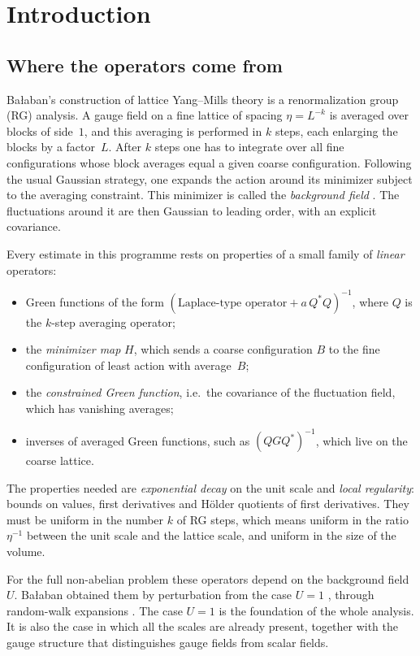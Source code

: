 \section{Introduction}\label{sec:intro}

\subsection{Where the operators come from}

Ba\l aban's construction of lattice Yang--Mills theory \cite{BalPropI,BalPropII,BalAvg,BalReg,BalBackground,BalVar,BalUV3} is a renormalization group (RG) analysis. A gauge field on a fine lattice of spacing $\eta=L^{-k}$ is averaged over blocks of side~$1$, and this averaging is performed in $k$ steps, each enlarging the blocks by a factor~$L$. After $k$ steps one has to integrate over all fine configurations whose block averages equal a given coarse configuration. Following the usual Gaussian strategy, one expands the action around its minimizer subject to the averaging constraint. This minimizer is called the \emph{background field} \cite{BalVar}. The fluctuations around it are then Gaussian to leading order, with an explicit covariance.

Every estimate in this programme rests on properties of a small family of \emph{linear} operators:
\begin{itemize}
\item Green functions of the form $(\text{Laplace-type operator}+a\,Q^*Q)^{-1}$, where $Q$ is the $k$-step averaging operator;
\item the \emph{minimizer map} $H$, which sends a coarse configuration $B$ to the fine configuration of least action with average~$B$;
\item the \emph{constrained Green function}, i.e.\ the covariance of the fluctuation field, which has vanishing averages;
\item inverses of averaged Green functions, such as $(QGQ^*)^{-1}$, which live on the coarse lattice.
\end{itemize}
The properties needed are \emph{exponential decay} on the unit scale and \emph{local regularity}: bounds on values, first derivatives and H\"older quotients of first derivatives. They must be uniform in the number $k$ of RG steps, which means uniform in the ratio $\eta^{-1}$ between the unit scale and the lattice scale, and uniform in the size of the volume.

For the full non-abelian problem these operators depend on the background field $U$. Ba\l aban obtained them by perturbation from the case $U=1$ \cite{BalPropI}, through random-walk expansions \cite{BalPropII,BalBackground}. The case $U=1$ is the foundation of the whole analysis. It is also the case in which all the scales are already present, together with the gauge structure that distinguishes gauge fields from scalar fields.

